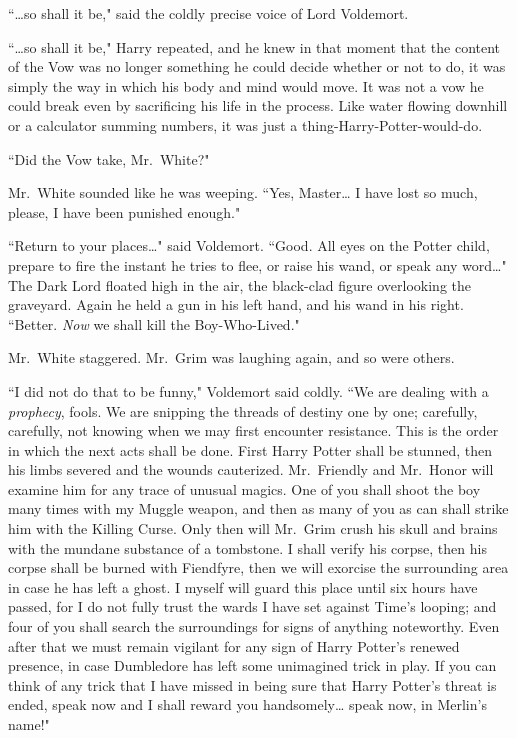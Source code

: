 ``{\ldots}so shall it be," said the coldly precise voice of Lord Voldemort.

``{\ldots}so shall it be," Harry repeated, and he knew in that moment that the content of the Vow was no longer something he could decide whether or not to do, it was simply the way in which his body and mind would move. It was not a vow he could break even by sacrificing his life in the process. Like water flowing downhill or a calculator summing numbers, it was just a thing-Harry-Potter-would-do.

``Did the Vow take, Mr.~White?"

Mr.~White sounded like he was weeping. ``Yes, Master{\ldots} I have lost so much, please, I have been punished enough."

``Return to your places{\ldots}" said Voldemort. ``Good. All eyes on the Potter child, prepare to fire the instant he tries to flee, or raise his wand, or speak any word{\ldots}" The Dark Lord floated high in the air, the black-clad figure overlooking the graveyard. Again he held a gun in his left hand, and his wand in his right. ``Better. \emph{Now} we shall kill the Boy-Who-Lived."

Mr.~White staggered. Mr.~Grim was laughing again, and so were others.

``I did not do that to be funny," Voldemort said coldly. ``We are dealing with a \emph{prophecy}, fools. We are snipping the threads of destiny one by one; carefully, carefully, not knowing when we may first encounter resistance. This is the order in which the next acts shall be done. First Harry Potter shall be stunned, then his limbs severed and the wounds cauterized. Mr.~Friendly and Mr.~Honor will examine him for any trace of unusual magics. One of you shall shoot the boy many times with my Muggle weapon, and then as many of you as can shall strike him with the Killing Curse. Only then will Mr.~Grim crush his skull and brains with the mundane substance of a tombstone. I shall verify his corpse, then his corpse shall be burned with Fiendfyre, then we will exorcise the surrounding area in case he has left a ghost. I myself will guard this place until six hours have passed, for I do not fully trust the wards I have set against Time's looping; and four of you shall search the surroundings for signs of anything noteworthy. Even after that we must remain vigilant for any sign of Harry Potter's renewed presence, in case Dumbledore has left some unimagined trick in play. If you can think of any trick that I have missed in being sure that Harry Potter's threat is ended, speak now and I shall reward you handsomely{\ldots} speak now, in Merlin's name!"

